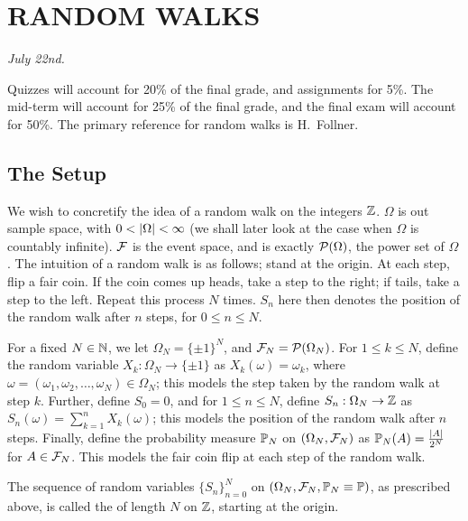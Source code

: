 \chapter{RANDOM WALKS}

\textit{July 22nd.}

Quizzes will account for 20\% of the final grade, and assignments for 5\%. The mid-term will account for 25\% of the final grade, and the final exam will account for 50\%. The primary reference for random walks is H.~Follner.

\section{The Setup}
We wish to concretify the idea of a random walk on the integers $\mathbb{Z}$. $\Omega$ is out sample space, with $0 < \left| \Omega \right| < \infty$ (we shall later look at the case when $\Omega$ is countably infinite). $\mathcal{F}$ is the event space, and is exactly $\mathcal{P}(\Omega)$, the power set of $\Omega$. The intuition of a random walk is as follows; stand at the origin. At each step, flip a fair coin. If the coin comes up heads, take a step to the right; if tails, take a step to the left. Repeat this process $N$ times. $S_{n}$ here then denotes the position of the random walk after $n$ steps, for $0 \leq n \leq N$.

For a fixed $N \in \mathbb{N}$, we let $\Omega_{N} = \{\pm 1\}^{N}$, and $\mathcal{F}_{N} = \mathcal{P}(\Omega_{N})$. For $1 \leq k \leq N$, define the random variable $X_{k}:\Omega_{N} \to \{\pm 1\}$ as $X_{k}(\omega) = \omega_{k}$, where $\omega = (\omega_{1}, \omega_{2}, \ldots, \omega_{N}) \in \Omega_{N}$; this models the step taken by the random walk at step $k$. Further, define $S_{0} = 0$, and for $1 \leq n \leq N$, define $S_{n}:\Omega_{N} \to \mathbb{Z}$ as $S_{n}(\omega) = \sum_{k=1}^{n} X_{k}(\omega)$; this models the position of the random walk after $n$ steps. Finally, define the probability measure $\mathbb{P}_{N}$ on $(\Omega_{N}, \mathcal{F}_{N})$ as $\mathbb{P}_{N}(A) = \frac{\left| A \right|}{2^{N}}$ for $A \in \mathcal{F}_{N}$. This models the fair coin flip at each step of the random walk.


\begin{definition}
    The sequence of random variables $\{S_{n}\}_{n=0}^{N}$ on $(\Omega_{N}, \mathcal{F}_{N}, \mathbb{P}_{N} \equiv \mathbb{P})$, as prescribed above, is called the  of length $N$ on $\mathbb{Z}$, starting at the origin.
\end{definition}

